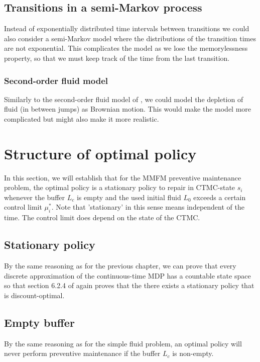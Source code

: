 \documentclass[a4paper]{thesis}
\theoremstyle{definition}
\begin{document}
\subsection{Transitions in a semi-Markov process}
Instead of exponentially distributed time intervals between transitions we could also consider a semi-Markov model where the distributions of the transition times are not exponential.
This complicates the model as we lose the memorylessness property, so that we must keep track of the time from the last transition.

\subsubsection{Second-order fluid model}
Similarly to the second-order fluid model of \cite{Gribaudo2007}, we could model the depletion of fluid (in between jumps) as Brownian motion.
This would make the model more complicated but might also make it more realistic. \section{Structure of optimal policy}
In this section, we will establish that for the MMFM preventive maintenance problem, the optimal policy is a stationary policy to repair in CTMC-state $s_i$ whenever the buffer $L_c$ is empty and the used initial fluid $L_0$ exceeds a certain control limit $\mu_i^*$.
Note that 'stationary' in this sense means independent of the time. 
The control limit does depend on the state of the CTMC.

\subsection{Stationary policy}
By the same reasoning as for the previous chapter, we can prove that every discrete approximation of the continuous-time MDP has a countable state space so that section 6.2.4 of \cite{Puterman2008} again proves that the there exists a stationary policy that is discount-optimal.

\subsection{Empty buffer}
By the same reasoning as for the simple fluid problem, an optimal policy will never perform preventive maintenance if the buffer $L_c$ is non-empty.
\end{document}
